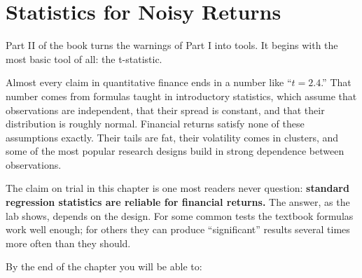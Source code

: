 \makeatletter
{}
\makeatother

\chapter{Statistics for Noisy Returns}
\label{ch:03}

Part II of the book turns the warnings of Part I into tools. It begins with the most basic tool of all: the t-statistic.

Almost every claim in quantitative finance ends in a number like ``$t = 2.4$.'' That number comes from formulas taught in introductory statistics, which assume that observations are independent, that their spread is constant, and that their distribution is roughly normal. Financial returns satisfy none of these assumptions exactly. Their tails are fat, their volatility comes in clusters, and some of the most popular research designs build in strong dependence between observations.

The claim on trial in this chapter is one most readers never question: \textbf{standard regression statistics are reliable for financial returns.} The answer, as the lab shows, depends on the design. For some common tests the textbook formulas work well enough; for others they can produce ``significant'' results several times more often than they should.

By the end of the chapter you will be able to:

